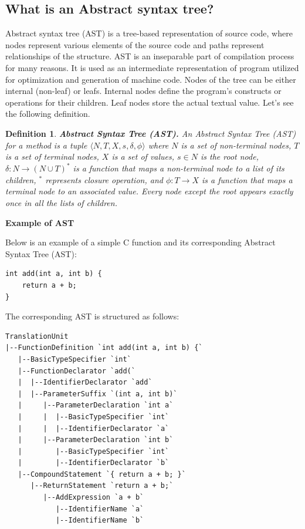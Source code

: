 \documentclass[10pt,english,a4paper]{report}
\newtheorem{definition}{Definition}
\begin{document}
\subsection{What is an Abstract syntax tree?}
\quad Abstract syntax tree (AST) is a tree-based representation of source code, where nodes represent various elements of the source code and paths represent relationships of the structure. AST is an inseparable part of compilation process for many reasons. It is used as an intermediate representation of program utilized for optimization and generation of machine code. Nodes of the tree can be either internal (non-leaf) or leafs. Internal nodes define the program's constructs or operations for their children. Leaf nodes store the actual textual value. Let's see the following definition.
\begin{definition}
\cite{sun2023AST}
\textbf{Abstract Syntax Tree (AST).} An Abstract Syntax Tree (AST) for a method is a tuple
$\langle N, T, X, s, \delta, \phi \rangle$ where $N$ is a set of non-terminal nodes, $T$ is a set of terminal nodes, $X$ is a set of values, $s \in N$ is the root node, $\delta : N \to (N \cup T)^*$ is a function that maps a non-terminal node to a list of its children, $^*$ represents closure operation, and $\phi : T \to X$ is a function that maps a terminal node to an associated value. Every node except the root appears exactly once in all the lists of children.
\end{definition}

\textbf{Example of AST}

Below is an example of a simple C function and its corresponding Abstract Syntax Tree (AST):
\begin{verbatim}
int add(int a, int b) {
    return a + b;
}
\end{verbatim}

The corresponding AST is structured as follows:
\begin{verbatim}
TranslationUnit
|--FunctionDefinition `int add(int a, int b) {`
   |--BasicTypeSpecifier `int`
   |--FunctionDeclarator `add(`
   |  |--IdentifierDeclarator `add`
   |  |--ParameterSuffix `(int a, int b)`
   |     |--ParameterDeclaration `int a`
   |     |  |--BasicTypeSpecifier `int`
   |     |  |--IdentifierDeclarator `a`
   |     |--ParameterDeclaration `int b`
   |        |--BasicTypeSpecifier `int`
   |        |--IdentifierDeclarator `b`
   |--CompoundStatement `{ return a + b; }`
      |--ReturnStatement `return a + b;`
         |--AddExpression `a + b`
            |--IdentifierName `a`
            |--IdentifierName `b`
\end{verbatim}
\label{verbatim:AST_example}
\end{document}
